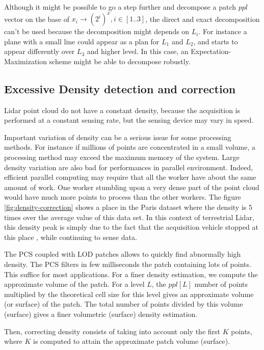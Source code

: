 		Although it might be possible to go a step further and decompose a patch $ppl$ vector on the base of $x_i \rightarrow (2^i)^x, i \in [1..3]$, the direct and exact decomposition can't be used because the decomposition might depends on $L_i$. For instance a plane with a small line could appear as a plan for $L_1$ and $L_2$, and starts to appear differently over $L_3$ and higher level. In this case, an Expectation-Maximization scheme might be able to decompose robustly.
 
	\subsection{Excessive Density detection and correction}
		\label{method.density}
		Lidar point cloud do not have a constant density, because the acquisition is performed at a constant sensing rate, but the sensing device may vary in speed.
		
		Important variation of density can be a serious issue for some processing methods. 
		For instance if millions of points are concentrated in a small volume,
		a processing method may exceed the maximum memory of the system.
		Large density variation are also bad for performances in parallel environment.
		Indeed, efficient parallel computing may require that all the worker have about the same amount of work.
		One worker stumbling upon a very dense part of the point cloud would have much more points to process than the other workers.
		The figure \ref{fig:density-correction} shows a place in the Paris dataset where the density is 5 times over the average value of this data set.
		In this context of terrestrial Lidar, this density peak is simply due to the fact that the acquisition vehicle stopped at this place
		, while continuing to sense data.
		
		The PCS coupled with LOD patches allows to quickly find abnormally high density.
		The PCS filters in few milliseconds the patch containing lots of points. This suffice for most applications.
		For a finer density estimation, we compute the approximate volume of the patch.
		For a level $L$, the $ppl[L]$ number of points multiplied by the theoretical cell size for this level gives an approximate volume (or surface) of the patch.
		The total number of points divided by this volume (surface) gives a finer volumetric (surface) density estimation.
		
		Then, correcting density consists of taking into account only the first $K$ points, where $K$ is computed to attain the approximate patch volume (surface).
		
